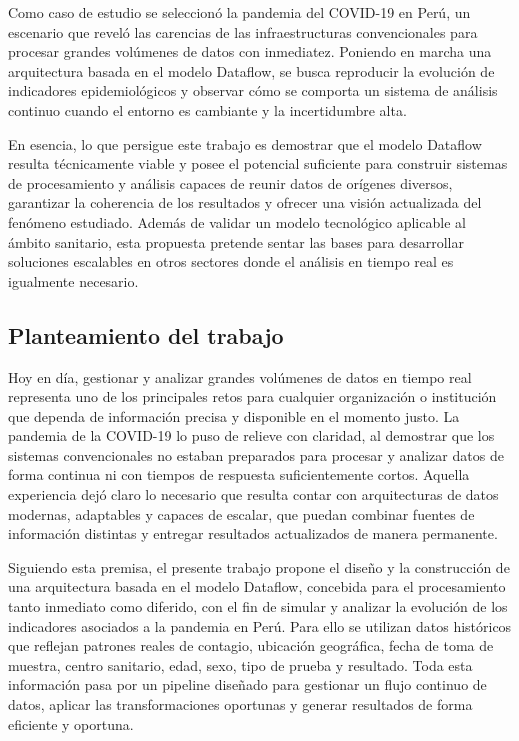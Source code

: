 \documentclass[12pt,a4paper]{article}
\begin{document}
Como caso de estudio se seleccionó la pandemia del COVID-19 en Perú, un escenario que reveló las carencias de las infraestructuras convencionales para procesar grandes volúmenes de datos con inmediatez. Poniendo en marcha una arquitectura basada en el modelo Dataflow, se busca reproducir la evolución de indicadores epidemiológicos y observar cómo se comporta un sistema de análisis continuo cuando el entorno es cambiante y la incertidumbre alta.

En esencia, lo que persigue este trabajo es demostrar que el modelo Dataflow resulta técnicamente viable y posee el potencial suficiente para construir sistemas de procesamiento y análisis capaces de reunir datos de orígenes diversos, garantizar la coherencia de los resultados y ofrecer una visión actualizada del fenómeno estudiado. Además de validar un modelo tecnológico aplicable al ámbito sanitario, esta propuesta pretende sentar las bases para desarrollar soluciones escalables en otros sectores donde el análisis en tiempo real es igualmente necesario.

\subsection{Planteamiento del trabajo}\label{planteamiento-del-trabajo}

Hoy en día, gestionar y analizar grandes volúmenes de datos en tiempo real representa uno de los principales retos para cualquier organización o institución que dependa de información precisa y disponible en el momento justo. La pandemia de la COVID-19 lo puso de relieve con claridad, al demostrar que los sistemas convencionales no estaban preparados para procesar y analizar datos de forma continua ni con tiempos de respuesta suficientemente cortos. Aquella experiencia dejó claro lo necesario que resulta contar con arquitecturas de datos modernas, adaptables y capaces de escalar, que puedan combinar fuentes de información distintas y entregar resultados actualizados de manera permanente.

Siguiendo esta premisa, el presente trabajo propone el diseño y la construcción de una arquitectura basada en el modelo Dataflow, concebida para el procesamiento tanto inmediato como diferido, con el fin de simular y analizar la evolución de los indicadores asociados a la pandemia en Perú. Para ello se utilizan datos históricos que reflejan patrones reales de contagio, ubicación geográfica, fecha de toma de muestra, centro sanitario, edad, sexo, tipo de prueba y resultado. Toda esta información pasa por un pipeline diseñado para gestionar un flujo continuo de datos, aplicar las transformaciones oportunas y generar resultados de forma eficiente y oportuna.
\end{document}
